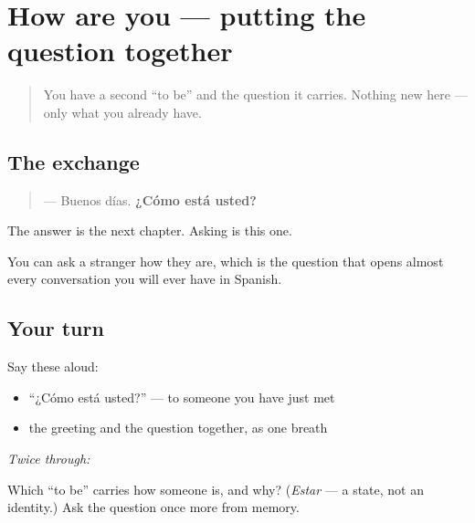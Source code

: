 \section[Practice]{How are you — putting the question together}

\label{lesson:ES-C04-repaso-como-esta}



\begin{quote}
You have a second \textquotedblleft{}to be\textquotedblright{} and the question it carries. Nothing new here — only what you already have.
\end{quote}

\subsection*{The exchange}
\begin{quote}
— Buenos días. \textbf{¿Cómo está usted?}
\end{quote}

The answer is the next chapter. Asking is this one.

\begin{grammarlens}[title={What you've built}]
You can ask a stranger how they are, which is the question that opens almost every conversation you will ever have in Spanish.
\end{grammarlens}

\subsection*{Your turn}
Say these aloud:

\begin{itemize}
\raggedright
  \item \textquotedblleft{}¿Cómo está usted?\textquotedblright{} — to someone you have just met
  \item the greeting and the question together, as one breath
\end{itemize}

\emph{Twice through:}

\begin{tcolorbox}[breakable,colback=teal!4,colframe=teal!35!black,title={Before you move on}]
Which \textquotedblleft{}to be\textquotedblright{} carries how someone is, and why? (\emph{Estar} — a state, not an identity.) Ask the question once more from memory.
\end{tcolorbox}
